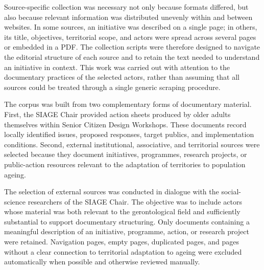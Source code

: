 
Source-specific collection was necessary not only because formats differed, but
also because relevant information was distributed unevenly within and between
websites. In some sources, an initiative was described on a single page; in others,
its title, objectives, territorial scope, and actors were spread across several pages
or embedded in a PDF. The collection scripts were therefore designed to navigate
the editorial structure of each source and to retain the text needed to understand
an initiative in context. This work was carried out with attention to the
documentary practices of the selected actors, rather than assuming that all sources
could be treated through a single generic scraping procedure.


The corpus was built from two complementary forms of documentary material. First,
the SIAGE Chair provided action sheets produced by older adults themselves within
Senior Citizen Design Workshops. These documents record locally identified issues,
proposed responses, target publics, and implementation conditions. Second,
external institutional, associative, and territorial sources were selected because
they document initiatives, programmes, research projects, or public-action
resources relevant to the adaptation of territories to population ageing.

The selection of external sources was conducted in dialogue with the
social-science researchers of the SIAGE Chair. The objective was to include actors
whose material was both relevant to the gerontological field and sufficiently
substantial to support documentary structuring. Only documents containing a
meaningful description of an initiative, programme, action, or research project
were retained. Navigation pages, empty pages, duplicated pages, and pages without
a clear connection to territorial adaptation to ageing were excluded automatically
when possible and otherwise reviewed manually.


